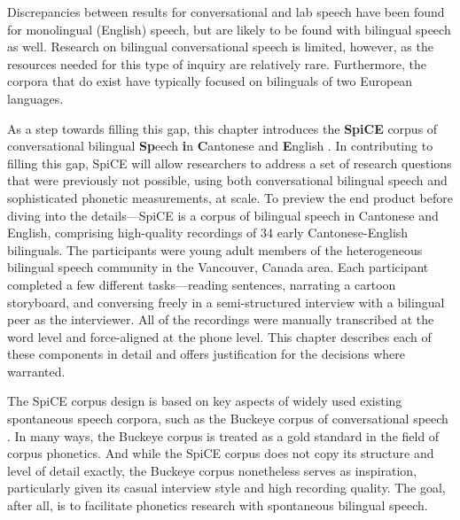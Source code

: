 Discrepancies between results for conversational and lab speech have been found for monolingual (English) speech, but are likely to be found with bilingual speech as well. Research on bilingual conversational speech is limited, however, as the resources needed for this type of inquiry are relatively rare. Furthermore, the corpora that do exist have typically focused on bilinguals of two European languages.

As a step towards filling this gap, this chapter introduces the \textbf{SpiCE} corpus of conversational bilingual \textbf{Sp}eech \textbf{i}n \textbf{C}antonese and \textbf{E}nglish \citep{johnson_2021_spice}. In contributing to filling this gap, SpiCE will allow researchers to address a set of research questions that were previously not possible, using both conversational bilingual speech and sophisticated phonetic measurements, at scale. To preview the end product before diving into the details---SpiCE is a corpus of bilingual speech in Cantonese and English, comprising high-quality recordings of 34 early Cantonese-English bilinguals. The participants were young adult members of the heterogeneous bilingual speech community in the Vancouver, Canada area. Each participant completed a few different tasks—reading sentences, narrating a cartoon storyboard, and conversing freely in a semi-structured interview with a bilingual peer as the interviewer. All of the recordings were manually transcribed at the word level and force-aligned at the phone level. This chapter describes each of these components in detail and offers justification for the decisions where warranted.

The SpiCE corpus design is based on key aspects of widely used existing spontaneous speech corpora, such as the Buckeye corpus of conversational speech \citep{pitt_2005_buckeye}. In many ways, the Buckeye corpus is treated as a gold standard in the field of corpus phonetics. And while the SpiCE corpus does not copy its structure and level of detail exactly, the Buckeye corpus nonetheless serves as inspiration, particularly given its casual interview style and high recording quality. The goal, after all, is to facilitate phonetics research with spontaneous bilingual speech. 

